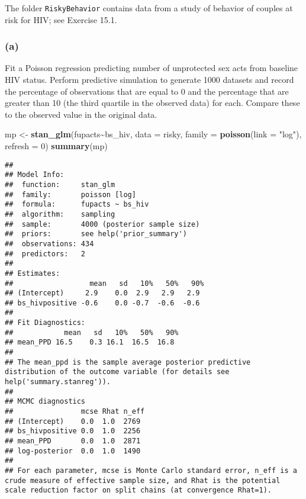 \documentclass[
]{article}
\newenvironment{Shaded}{\begin{snugshade}}{\end{snugshade}}
\newcommand{\AttributeTok}[1]{\textcolor[rgb]{0.13,0.29,0.53}{#1}}
\newcommand{\DecValTok}[1]{\textcolor[rgb]{0.00,0.00,0.81}{#1}}
\newcommand{\FunctionTok}[1]{\textcolor[rgb]{0.13,0.29,0.53}{\textbf{#1}}}
\newcommand{\NormalTok}[1]{#1}
\newcommand{\OtherTok}[1]{\textcolor[rgb]{0.56,0.35,0.01}{#1}}
\newcommand{\SpecialCharTok}[1]{\textcolor[rgb]{0.81,0.36,0.00}{\textbf{#1}}}
\newcommand{\StringTok}[1]{\textcolor[rgb]{0.31,0.60,0.02}{#1}}
\begin{document}
The folder \texttt{RiskyBehavior} contains data from a study of behavior
of couples at risk for HIV; see Exercise 15.1.

\hypertarget{a-4}{%
\subsubsection{(a)}\label{a-4}}

Fit a Poisson regression predicting number of unprotected sex acts from
baseline HIV status. Perform predictive simulation to generate 1000
datasets and record the percentage of observations that are equal to 0
and the percentage that are greater than 10 (the third quartile in the
observed data) for each. Compare these to the observed value in the
original data.

\begin{Shaded}
\begin{Highlighting}[]
\NormalTok{mp }\OtherTok{\textless{}{-}} \FunctionTok{stan\_glm}\NormalTok{(fupacts}\SpecialCharTok{\textasciitilde{}}\NormalTok{bs\_hiv, }\AttributeTok{data =}\NormalTok{ risky, }\AttributeTok{family =} \FunctionTok{poisson}\NormalTok{(}\AttributeTok{link =} \StringTok{"log"}\NormalTok{), }\AttributeTok{refresh =} \DecValTok{0}\NormalTok{)}
\FunctionTok{summary}\NormalTok{(mp)}
\end{Highlighting}
\end{Shaded}

\begin{verbatim}
## 
## Model Info:
##  function:     stan_glm
##  family:       poisson [log]
##  formula:      fupacts ~ bs_hiv
##  algorithm:    sampling
##  sample:       4000 (posterior sample size)
##  priors:       see help('prior_summary')
##  observations: 434
##  predictors:   2
## 
## Estimates:
##                  mean   sd   10%   50%   90%
## (Intercept)     2.9    0.0  2.9   2.9   2.9 
## bs_hivpositive -0.6    0.0 -0.7  -0.6  -0.6 
## 
## Fit Diagnostics:
##            mean   sd   10%   50%   90%
## mean_PPD 16.5    0.3 16.1  16.5  16.8 
## 
## The mean_ppd is the sample average posterior predictive distribution of the outcome variable (for details see help('summary.stanreg')).
## 
## MCMC diagnostics
##                mcse Rhat n_eff
## (Intercept)    0.0  1.0  2769 
## bs_hivpositive 0.0  1.0  2256 
## mean_PPD       0.0  1.0  2871 
## log-posterior  0.0  1.0  1490 
## 
## For each parameter, mcse is Monte Carlo standard error, n_eff is a crude measure of effective sample size, and Rhat is the potential scale reduction factor on split chains (at convergence Rhat=1).
\end{verbatim}
\end{document}
